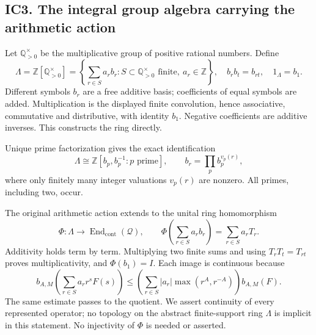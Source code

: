 \documentclass[
]{article}
\begin{document}
\subsection{IC3. The integral group algebra carrying the arithmetic
action}\label{ic3.-the-integral-group-algebra-carrying-the-arithmetic-action}

Let \(\mathbb Q_{>0}^{\times}\) be the multiplicative group of positive
rational numbers. Define \[
\Lambda=\mathbb Z[\mathbb Q_{>0}^{\times}]
=\left\{\sum_{r\in S}a_r b_r:
 S\subset\mathbb Q_{>0}^{\times}\text{ finite},\ a_r\in\mathbb Z\right\},
\quad b_rb_t=b_{rt},\quad 1_\Lambda=b_1.
\tag{IC3.1}
\] Different symbols \(b_r\) are a free additive basis; coefficients of
equal symbols are added. Multiplication is the displayed finite
convolution, hence associative, commutative and distributive, with
identity \(b_1\). Negative coefficients are additive inverses. This
constructs the ring directly.

Unique prime factorization gives the exact identification \[
\Lambda\cong\mathbb Z[b_p,b_p^{-1}:p\text{ prime}],
\qquad b_r=\prod_p b_p^{v_p(r)},
\tag{IC3.2}
\] where only finitely many integer valuations \(v_p(r)\) are nonzero.
All primes, including two, occur.

The original arithmetic action extends to the unital ring homomorphism
\[
\Phi:\Lambda\longrightarrow\operatorname{End}_{\mathrm{cont}}(\mathcal Q),
\qquad
\Phi\left(\sum_{r\in S}a_r b_r\right)
=\sum_{r\in S}a_r T_r.
\tag{IC3.3}
\] Additivity holds term by term. Multiplying two finite sums and using
\(T_rT_t=T_{rt}\) proves multiplicativity, and \(\Phi(b_1)=I\). Each
image is continuous because \[
b_{A,M}\left(\sum_{r\in S}a_r r^sF(s)\right)
\le\left(\sum_{r\in S}|a_r|\max(r^A,r^{-A})\right)b_{A,M}(F).
\tag{IC3.4}
\] The same estimate passes to the quotient. We assert continuity of
every represented operator; no topology on the abstract finite-support
ring \(\Lambda\) is implicit in this statement. No injectivity of
\(\Phi\) is needed or asserted.
\end{document}
